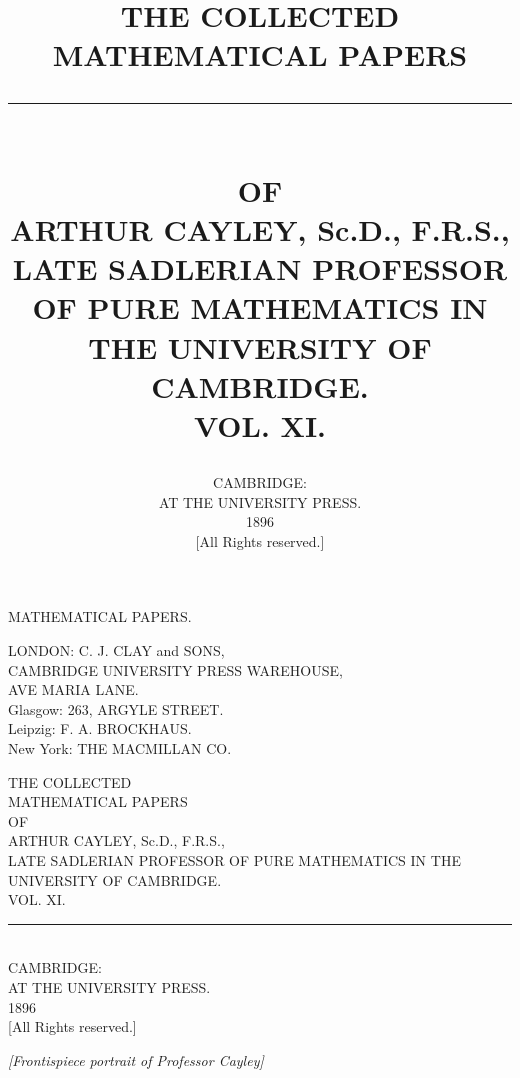 \documentclass[12pt,a4paper,oneside]{book}
\title{\vspace{-2em}THE COLLECTED\\[0.5em]MATHEMATICAL PAPERS\\[1.5em]\rule{0.3\textwidth}{0.4pt}\\[1.5em]
{\large OF}\\[1em]ARTHUR CAYLEY, Sc.D., F.R.S.,\\[0.5em]
\footnotesize LATE SADLERIAN PROFESSOR OF PURE MATHEMATICS IN THE UNIVERSITY OF CAMBRIDGE.\\[2em]
VOL. XI.}
\author{}
\date{\vspace{1em}CAMBRIDGE:\\AT THE UNIVERSITY PRESS.\\1896\\[0.5em]\footnotesize [All Rights reserved.]}
\theoremstyle{plain}
\theoremstyle{definition}
\theoremstyle{remark}
\begin{document}
\frontmatter

\thispagestyle{empty}
\begin{center}
\vspace*{\fill}
{\Large MATHEMATICAL PAPERS.}
\vspace*{\fill}
\end{center}
\cleardoublepage

\thispagestyle{empty}
\begin{center}
\vspace*{\fill}
\small
LONDON: C. J. CLAY and SONS,\\
CAMBRIDGE UNIVERSITY PRESS WAREHOUSE,\\
AVE MARIA LANE.\\[0.5em]
Glasgow: 263, ARGYLE STREET.\\[0.5em]
Leipzig: F. A. BROCKHAUS.\\
New York: THE MACMILLAN CO.
\vspace*{\fill}
\end{center}
\cleardoublepage

\thispagestyle{empty}
\begin{center}
\vspace*{2em}
{\large THE COLLECTED}\\[1em]
{\LARGE MATHEMATICAL PAPERS}\\[2em]
{\large OF}\\[2em]
{\Large ARTHUR CAYLEY, Sc.D., F.R.S.,}\\[0.5em]
{\footnotesize LATE SADLERIAN PROFESSOR OF PURE MATHEMATICS IN THE UNIVERSITY OF CAMBRIDGE.}\\[4em]
{\Large VOL. XI.}\\[5em]
\rule{0.3\textwidth}{0.4pt}\\[1em]
CAMBRIDGE:\\
AT THE UNIVERSITY PRESS.\\
1896\\[0.5em]
{\small [All Rights reserved.]}
\end{center}
\cleardoublepage

\thispagestyle{empty}
\vspace*{\fill}
\begin{center}
\textit{[Frontispiece portrait of Professor Cayley]}
\end{center}
\vspace*{\fill}
\cleardoublepage
\end{document}

